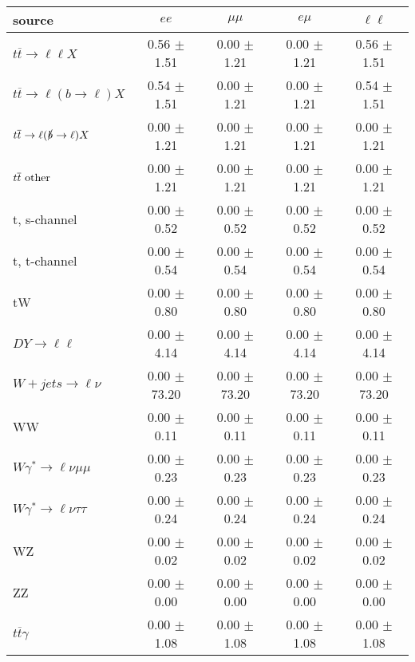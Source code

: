 \begin{tabular}{l|cccc} \hline\hline
source & $ee$ & $\mu\mu$ & $e\mu$ & $\ell\ell $ \\
\hline
$t\overline{t} \rightarrow \ell \ell X$ &  0.56 $\pm$  1.51 &  0.00 $\pm$  1.21 &  0.00 $\pm$  1.21 &  0.56 $\pm$  1.51 \\
$t\overline{t} \rightarrow \ell (b \rightarrow \ell) X$ &  0.54 $\pm$  1.51 &  0.00 $\pm$  1.21 &  0.00 $\pm$  1.21 &  0.54 $\pm$  1.51 \\
$t\overline{t} \rightarrow \ell (\slashed b \rightarrow \ell) X$ &  0.00 $\pm$  1.21 &  0.00 $\pm$  1.21 &  0.00 $\pm$  1.21 &  0.00 $\pm$  1.21 \\
        $t\overline{t}\ \rm{other}$ &  0.00 $\pm$  1.21 &  0.00 $\pm$  1.21 &  0.00 $\pm$  1.21 &  0.00 $\pm$  1.21 \\
\hline
                       t, s-channel &  0.00 $\pm$  0.52 &  0.00 $\pm$  0.52 &  0.00 $\pm$  0.52 &  0.00 $\pm$  0.52 \\
                       t, t-channel &  0.00 $\pm$  0.54 &  0.00 $\pm$  0.54 &  0.00 $\pm$  0.54 &  0.00 $\pm$  0.54 \\
                                 tW &  0.00 $\pm$  0.80 &  0.00 $\pm$  0.80 &  0.00 $\pm$  0.80 &  0.00 $\pm$  0.80 \\
\hline
         $DY \rightarrow \ell \ell$ &  0.00 $\pm$  4.14 &  0.00 $\pm$  4.14 &  0.00 $\pm$  4.14 &  0.00 $\pm$  4.14 \\
      $W+jets \rightarrow \ell \nu$ &  0.00 $\pm$ 73.20 &  0.00 $\pm$ 73.20 &  0.00 $\pm$ 73.20 &  0.00 $\pm$ 73.20 \\
                                 WW &  0.00 $\pm$  0.11 &  0.00 $\pm$  0.11 &  0.00 $\pm$  0.11 &  0.00 $\pm$  0.11 \\
\hline
$W\gamma^{*} \rightarrow \ell \nu \mu\mu$ &  0.00 $\pm$  0.23 &  0.00 $\pm$  0.23 &  0.00 $\pm$  0.23 &  0.00 $\pm$  0.23 \\
$W\gamma^{*} \rightarrow \ell \nu \tau\tau$ &  0.00 $\pm$  0.24 &  0.00 $\pm$  0.24 &  0.00 $\pm$  0.24 &  0.00 $\pm$  0.24 \\
                                 WZ &  0.00 $\pm$  0.02 &  0.00 $\pm$  0.02 &  0.00 $\pm$  0.02 &  0.00 $\pm$  0.02 \\
                                 ZZ &  0.00 $\pm$  0.00 &  0.00 $\pm$  0.00 &  0.00 $\pm$  0.00 &  0.00 $\pm$  0.00 \\
\hline
              $t\overline{t}\gamma$ &  0.00 $\pm$  1.08 &  0.00 $\pm$  1.08 &  0.00 $\pm$  1.08 &  0.00 $\pm$  1.08 \\

\end{tabular}

